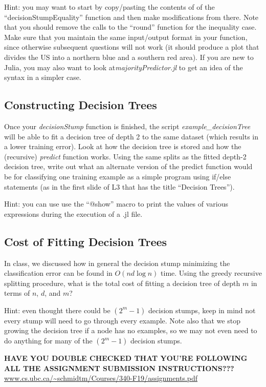 \documentclass{article}
\def\blu#1{{\color{blu}#1}}
\begin{document}
Hint: you may want to start by copy/pasting the contents of of the ``decisionStumpEquality'' function and then make modifications from there. Note that you should remove the calls to the ``round'' function for the inequality case.  Make sure that you maintain the same input/output format in your function, since otherwise subsequent questions will not work (it should produce a plot that divides the US into a northern blue and a southern red area).
If you are new to Julia, you may also want to look at\emph{majorityPredictor.jl} to get an idea of the syntax in  a simpler case.

\subsection{Constructing Decision Trees}

Once your \emph{decisionStump} function is finished, the script \emph{example\_decisionTree} will be able to fit a decision tree of depth 2 to the same dataset (which results in a lower training error). Look at how the decision tree is stored and how the (recursive) \emph{predict} function works. \blu{Using the same splits as the fitted depth-2 decision tree, write out what an alternate version of the predict function would be for classifying one training example as a simple program using if/else statements (as in the first slide of L3 that has the title ``Decision Trees'').}

Hint: you can use use the ``@show'' macro to print the values of various expressions during the execution of a .jl file.

\subsection{Cost of Fitting Decision Trees}

In class, we discussed how in general the decision stump minimizing the classification error can be found in $O(nd\log n)$ time. Using the greedy recursive splitting procedure, \blu{what is the total cost of fitting a decision tree of depth $m$ in terms of $n$, $d$, and $m$?} 

Hint: even thought there could be $(2^m-1)$ decision stumps, keep in mind not every stump will need to go through every example. Note also that we stop growing the decision tree if a node has no examples, so we may not even need to do anything for many of the $(2^m-1)$ decision stumps.

\vspace{25pt}
\textbf{HAVE YOU DOUBLE CHECKED THAT YOU'RE FOLLOWING ALL THE ASSIGNMENT SUBMISSION INSTRUCTIONS???}\\
\url{www.cs.ubc.ca/~schmidtm/Courses/340-F19/assignments.pdf}
\end{document}
